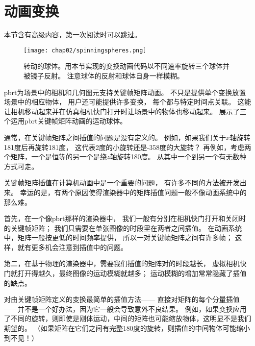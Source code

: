 \section{动画变换}\label{sec:动画变换}
\begin{remark}
    本节含有高级内容，第一次阅读时可以跳过。
\end{remark}

\begin{figure}[htbp]
    \centering\texttt{[image: chap02/spinningspheres.png]}
    \caption{转动的球体。用本节实现的变换动画代码以不同速率旋转三个球体并被镜子反射。
        注意球体的反射和球体自身一样模糊。}
    \label{fig:2.15}
\end{figure}

pbrt为场景中的相机和几何图元支持关键帧矩阵动画。
不只是提供单个变换放置场景中的相应物体，
用户还可能提供许多变换，
每个都与特定时间点关联。
这能让相机移动起来并在仿真相机快门打开时让场景中的物体也移动起来。
展示了三个运用pbrt关键帧矩阵动画的运动球体。

通常，在关键帧矩阵之间插值的问题是没有定义的。
例如，如果我们关于$x$轴旋转181度后再旋转181度，
这代表2度的小旋转还是-358度的大旋转？
再例如，考虑两个矩阵，一个是恒等的另一个是绕$z$轴旋转180度。
从其中一个到另一个有无数种方式可走。

关键帧矩阵插值在计算机动画中是一个重要的问题，
有许多不同的方法被开发出来。
幸运的是，有两个原因使得渲染器中的矩阵插值问题一般不像动画系统中的那么难。

首先，在一个像pbrt那样的渲染器中，
我们一般有分别在相机快门打开和关闭时的关键帧矩阵；
我们只需要在单张图像的时段里在两者之间插值。
在动画系统中，矩阵一般按更低的时间频率提供，
所以一对关键帧矩阵之间有许多帧；
这样，就有更多机会注意到插值中的问题。

第二，在基于物理的渲染器中，需要我们插值的矩阵对的时段越长，
虚拟相机快门就打开得越久，最终图像的运动模糊就越多；
运动模糊的增加常常隐藏了插值的缺点。

对由关键帧矩阵定义的变换最简单的插值方法——
直接对矩阵的每个分量插值——并不是一个好办法，因为它一般会导致意外不良结果。
例如，如果变换应用了不同的旋转，则即使是刚体运动，中间的矩阵也可能缩放物体，这明显不是我们期望的。
（如果矩阵在它们之间有完整180度的旋转，则插值的中间物体可能缩小到不见！）


